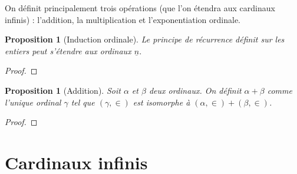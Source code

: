 \documentclass{article}
\theoremstyle{definition}
\theoremstyle{plain}
\newtheorem{proposition}[subsubsection]{Proposition}
\theoremstyle{plain}
\theoremstyle{plain}
\theoremstyle{plain}
\begin{document}
\begin{center}
\end{center}
\par On définit principalement trois opérations (que l'on étendra aux cardinaux infinis) : l'addition, la multiplication et l'exponentiation ordinale.
\begin{proposition}[Induction ordinale]
	Le principe de récurrence définit sur les entiers peut s'étendre aux ordinaux \( \underline{n} \).
\end{proposition}
\begin{proof}
	
\end{proof}
\begin{proposition}[Addition]
	Soit \( \alpha \) et \( \beta \) deux ordinaux. 
	On définit \( \alpha + \beta \) comme l'unique ordinal \( \gamma \) tel que \( (\gamma,\in) \) est isomorphe à \( (\alpha,\in) + (\beta,\in) \).
\end{proposition}
\begin{proof}
	
\end{proof}

\clearpage
\section{Cardinaux infinis}

\clearpage
\printbibliography
\end{document}
